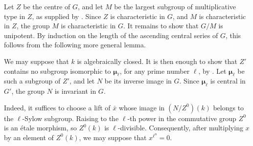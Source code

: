Let \(Z\) be the centre of \(G\), and let \(M\) be the largest
subgroup of multiplicative type in \(Z\), as supplied by .
Since \(Z\) is characteristic in \(G\), and \(M\) is
characteristic in \(Z\), the group \(M\) is characteristic in
\(G\).  It remains to show that \(G/M\) is unipotent.  By
induction on the length of the ascending central series of \(G\),
this follows from the following more general lemma.


We may suppose that \(k\) is algebraically closed.  It is then
enough to show that \(Z'\) contains no subgroup isomorphic to
\(\boldsymbol\mu_\ell\), for any prime number \(\ell\), by
.  Let \(\boldsymbol\mu_\ell\) be such a subgroup of
\(Z'\), and let \(N\) be its inverse image in \(G\).  Since
\(\boldsymbol\mu_\ell\) is central in \(G'\), the group \(N\) is
invariant in \(G\).

  Indeed, it suffices to choose a lift of \(\bar x\) whose image
  in \((N/Z^0)(k)\) belongs to the \(\ell\)-Sylow subgroup.
  Raising to the \(\ell\)-th power in the commutative group
  \(Z^0\) is an étale morphism, so \(Z^0(k)\) is
  \(\ell\)-divisible.  Consequently, after multiplying \(x\) by
  an element of \(Z^0(k)\), we may suppose that
  \(x^{\ell^n}=0\).
